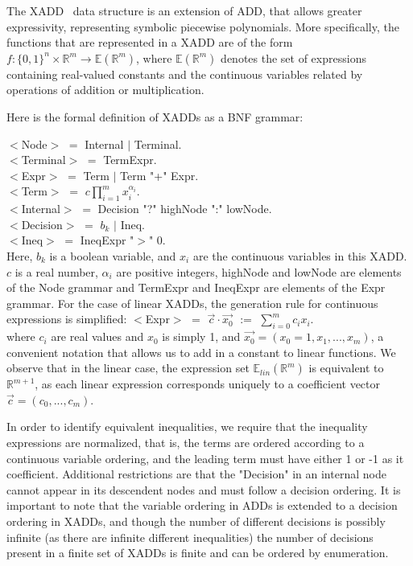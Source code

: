 The XADD~\cite{sanner_uai11} data structure is an extension of ADD, that allows greater expressivity, representing symbolic piecewise polynomials. More specifically, the functions that are represented in a XADD are of the form $f : \{ 0, 1\}^n\times \mathbb{R}^m \rightarrow \mathbb{E}(\mathbb{R}^m)$, where $\mathbb{E}(\mathbb{R}^m)$ denotes the set of expressions containing real-valued constants and the continuous variables related by operations of addition or multiplication.

Here is the formal definition of XADDs as a BNF grammar:

$<$Node$>$ $=$ Internal $|$ Terminal.\\
$<$Terminal$>$ $=$ TermExpr.\\
$<$Expr$>$ $=$ Term $|$ Term "+" Expr.\\
$<$Term$>$ $=$ $c \prod_{i=1}^m {x_i^{\alpha_i }}$.\\
$<$Internal$>$ $=$ Decision "?" highNode  ":" lowNode.\\
$<$Decision$>$ $=$ $b_k$ $|$ Ineq.\\
$<$Ineq$>$ $=$ IneqExpr "$>$" 0.\\

Here, $b_k$ is a boolean variable, and $x_i$ are the continuous variables in this XADD. $c$ is a real number, $\alpha_i$ are positive integers, highNode and lowNode are elements of the Node grammar and TermExpr and IneqExpr are elements of the Expr grammar.
For the case of linear XADDs, the generation rule for continuous expressions is simplified: $<$Expr$>$ $=$ $\vec{c}\cdot\vec{x_0}$ $:=$ $\sum_{i=0}^m {c_i x_i}$.\\
where $c_i$ are real values and $x_0$ is simply 1, and $\vec{x_0} = (x_0 = 1 ,x_1,..., x_m)$, a convenient notation that allows us to add in a constant to linear functions. We observe that in the linear case, the expression set $\mathbb{E}_{lin}(\mathbb{R}^m)$ is equivalent to $\mathbb{R}^{m+1}$, as each linear expression corresponds uniquely to a coefficient vector $\vec{c} = (c_0, ..., c_m)$.

In order to identify equivalent inequalities, we require that the inequality expressions are normalized, that is, the terms are ordered according to a continuous variable ordering, and the leading term must have either 1 or -1 as it coefficient.
Additional restrictions are that the "Decision" in an internal node cannot appear in its descendent nodes and must follow a decision ordering. It is important to note that the variable ordering in ADDs is extended to a decision ordering in XADDs, and though the number of different decisions is possibly infinite (as there are infinite different inequalities) the number of decisions present in a finite set of XADDs is finite and can be ordered by enumeration.

